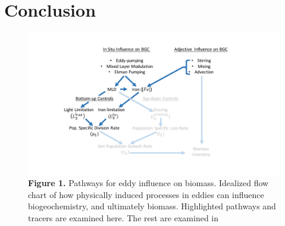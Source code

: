 \documentclass{article}
\begin{document}
\section{Conclusion}




\printbibliography



\begin{figure}[!htbp]
\begin{adjustwidth}{-1.5in}{-1in}
 \centering
 \includegraphics[scale=.8]{Fig1.pdf}
\end{adjustwidth}
\caption[Pathways for eddy influence on biomass]
{\textbf{Figure 1.} Pathways for eddy influence on biomass. Idealized flow chart of how physically induced processes in eddies can influence biogeochemistry, and ultimately biomass. Highlighted pathways and tracers are examined here. The rest are examined in \parencite{RohrEddyInducedVariabilityinprep.}}
\label{fig:Fig1}
\end{figure}

\end{document}
